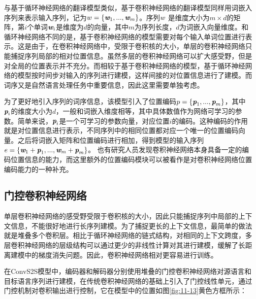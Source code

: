 \parinterval 与基于循环神经网络的翻译模型类似，基于卷积神经网络的翻译模型同样用词嵌入序列来表示输入序列，记为${w}=\{\textbf{\em w}_1,...,\textbf{\em w}_m\}$。序列${w}$ 是维度大小为$m \times d$的矩阵，第$i$个单词$\textbf{\em w}_i$是维度为$d$的向量，其中$m$为序列长度，$d$为词嵌入向量维度。和循环神经网络不同的是，基于卷积神经网络的模型需要对每个输入单词位置进行表示。这是由于，在卷积神经网络中，受限于卷积核的大小，单层的卷积神经网络只能捕捉序列局部的相对位置信息。虽然多层的卷积神经网络可以扩大感受野，但是对全局的位置表示并不充分。而相较于基于卷积神经网络的模型，基于循环神经网络的模型按时间步对输入的序列进行建模，这样间接的对位置信息进行了建模。而词序又是自然语言处理任务中重要信息，因此这里需要单独考虑。

\parinterval 为了更好地引入序列的词序信息，该模型引入了位置编码${p}=\{\textbf{\em p}_1,...,\textbf{\em p}_m\}$，其中$\textbf{\em p}_i$的维度大小为$d$，一般和词嵌入维度相等，其中具体数值作为网络可学习的参数。简单来说，$\textbf{\em p}_i$是一个可学习的参数向量，对应位置$i$的编码。这种编码的作用就是对位置信息进行表示，不同序列中的相同位置都对应一个唯一的位置编码向量。之后将词嵌入矩阵和位置编码进行相加，得到模型的输入序列${e}=\{\textbf{\em w}_1+\textbf{\em p}_1,...,\textbf{\em w}_m+\textbf{\em p}_m\}$。 也有研究人员发现卷积神经网络本身具备一定的编码位置信息的能力，而这里额外的位置编码模块可以被看作是对卷积神经网络位置编码能力的一种补充。


\subsection{门控卷积神经网络}

\parinterval 单层卷积神经网络的感受野受限于卷积核的大小，因此只能捕捉序列中局部的上下文信息，不能很好地进行长序列建模。为了捕捉更长的上下文信息，最简单的做法就是堆叠多个卷积层。相比于循环神经网络的链式结构，对相同的上下文跨度，多层卷积神经网络的层级结构可以通过更少的非线性计算对其进行建模，缓解了长距离建模中的梯度消失问题。因此，卷积神经网络相对更容易进行训练。

\parinterval 在ConvS2S模型中，编码器和解码器分别使用堆叠的门控卷积神经网络对源语言和目标语言序列进行建模，在传统卷积神经网络的基础上引入了门控线性单元，通过门控机制对卷积输出进行控制，它在模型中的位置如图\ref{fig:11-13}黄色方框所示：

